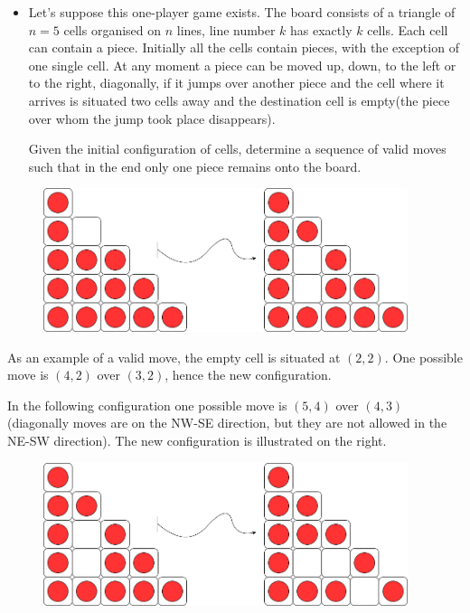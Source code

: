 \documentclass[letterpaper]{article}
\begin{document}
\begin{itemize}
    \item Let's suppose this one-player game exists. The board consists of a triangle of $n = 5$ cells organised on $n$ lines, line number $k$ has exactly $k$ cells. Each cell can contain a piece. Initially all the cells contain pieces, with the exception of one single cell. At any moment a piece can be moved up, down, to the left or to the right, diagonally, if it jumps over another piece and the cell where it arrives is situated two cells away and the destination cell is empty(the piece over whom the jump took place disappears).
    
    Given the initial configuration of cells, determine a sequence of valid moves such that in the end only one piece remains onto the board.
\end{itemize}

\begin{figure} [h!]
\centering
\includegraphics[width=0.95\textwidth]{pngOfDiagrams/dpstate1.png}
\end{figure}

As an example of a valid move, the empty cell is situated at $(2,2)$. One possible move is $(4,2)$ over $(3,2)$, hence the new configuration.

In the following configuration one possible move is $(5,4)$ over $(4,3)$ (diagonally moves are on the NW-SE direction, but they are not allowed in the NE-SW direction). The new configuration is illustrated on the right.

\begin{figure} [h!]
\centering
\includegraphics[width=0.95\textwidth]{pngOfDiagrams/dpstate2.png}
\end{figure}
\end{document}
